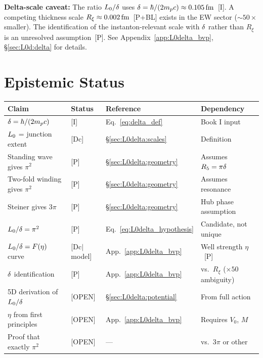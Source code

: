 \textbf{Delta-scale caveat:} The ratio $L_0/\delta$ uses $\delta =
\hbar/(2 m_p c) \approx 0.105\,\mathrm{fm}$~[I]. A competing thickness scale $R_\xi
\approx 0.002\,\mathrm{fm}$~[P+BL] exists in the EW sector ($\sim 50\times$ smaller).
The identification of the instanton-relevant scale with $\delta$ rather than
$R_\xi$ is an unresolved assumption~[P].
See Appendix~\ref{app:L0delta_bvp}, \S\ref{sec:L0d:delta} for details.

\section{Epistemic Status}
\label{sec:L0delta:epistemic}

\begin{center}
\begin{tabular}{llll}
\toprule
\textbf{Claim} & \textbf{Status} & \textbf{Reference} & \textbf{Dependency} \\
\midrule
$\delta = \hbar/(2m_p c)$ & [I] & Eq.~\eqref{eq:delta_def} & Book I input \\
$L_0$ = junction extent & [Dc] & \S\ref{sec:L0delta:scales} & Definition \\
Standing wave gives $\pi^2$ & [P] & \S\ref{sec:L0delta:geometry} & Assumes $R_5 = \pi\delta$ \\
Two-fold winding gives $\pi^2$ & [P] & \S\ref{sec:L0delta:geometry} & Assumes resonance \\
Steiner gives $3\pi$ & [P] & \S\ref{sec:L0delta:geometry} & Hub phase assumption \\
$L_0/\delta = \pi^2$ & [P] & Eq.~\eqref{eq:L0delta_hypothesis} & Candidate, not unique \\
$L_0/\delta = F(\eta)$ curve & [Dc$|$model] & App.~\ref{app:L0delta_bvp} & Well strength $\eta$~[P] \\
$\delta$ identification & [P] & App.~\ref{app:L0delta_bvp} & vs.\ $R_\xi$ ($\times 50$ ambiguity) \\
\midrule
5D derivation of $L_0/\delta$ & [OPEN] & \S\ref{sec:L0delta:potential} & From full action \\
$\eta$ from first principles & [OPEN] & App.~\ref{app:L0delta_bvp} & Requires $V_0$, $M$ \\
Proof that exactly $\pi^2$ & [OPEN] & — & vs.\ $3\pi$ or other \\
\bottomrule
\end{tabular}
\end{center}

